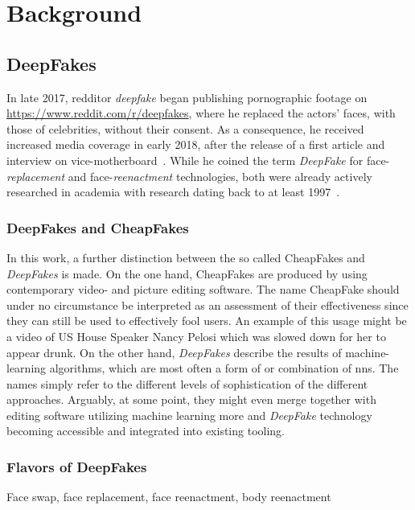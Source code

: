 \section{Background}\label{sect:background}
\subsection{DeepFakes}\label{subsect:deepfakes}
In late 2017, \gls{redditor} \textit{deepfake} began publishing pornographic footage
on \url{https://www.reddit.com/r/deepfakes}, where he replaced the actors' faces,
with those of celebrities, without their consent. As a consequence, he
received increased media coverage in early 2018, after the release of a first 
article and interview on vice-motherboard~\cite{Cole.2017}. While he coined the
term \textit{DeepFake} for face-\textit{replacement} and face-\textit{reenactment}
technologies, both were already actively researched in academia with research 
dating back to at least 1997~\cite{Bregler.1997}.

\subsubsection{DeepFakes and CheapFakes}
In this work, a further distinction between the so called CheapFakes and \textit{DeepFakes}
is made. On the one hand, CheapFakes are produced by using contemporary video- 
and picture editing software. The name CheapFake should under no circumstance be
interpreted as an assessment of their effectiveness since they can still be used
to effectively fool users. An example of this usage might be a video of US House
Speaker Nancy Pelosi which was slowed down for her to appear drunk.
On the other hand, \textit{DeepFakes} describe the results of machine-learning
algorithms, which are most often a form of or combination of \glspl{nn}.
The names simply refer to the different levels of sophistication of the different
approaches. Arguably, at some point, they might even merge together with editing 
software utilizing machine learning more and \textit{DeepFake} technology becoming
accessible and integrated into existing tooling.

\subsubsection{Flavors of DeepFakes}\label{subsubsect:deepfake-flavors}
Face swap, face replacement, face reenactment, body reenactment



